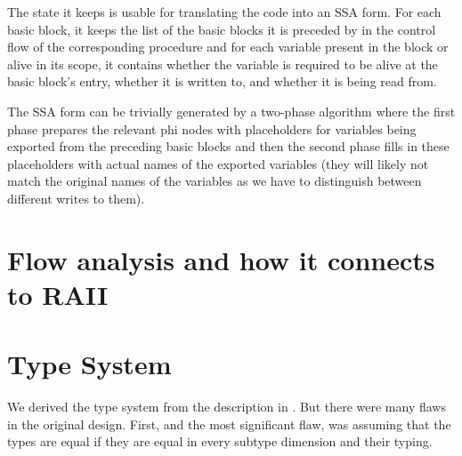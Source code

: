 The state it keeps is usable for translating the code into an SSA form. For each basic block, it keeps the list of the basic blocks it is preceded by in the control flow of the corresponding procedure and for each variable present in the block or alive in its scope, it contains whether the variable is required to be alive at the basic block's entry, whether it is written to, and whether it is being read from.

The SSA form can be trivially generated by a two-phase algorithm where the first phase prepares the relevant phi nodes with placeholders for variables being exported from the preceding basic blocks and then the second phase fills in these placeholders with actual names of the exported variables (they will likely not match the original names of the variables as we have to distinguish between different writes to them).

\section{Flow analysis and how it connects to RAII}

\section{Type System}

We derived the type system from the description in . But there were many flaws in the original design. First, and the most significant flaw, was assuming that the types are equal if they are equal in every subtype dimension and their typing.

